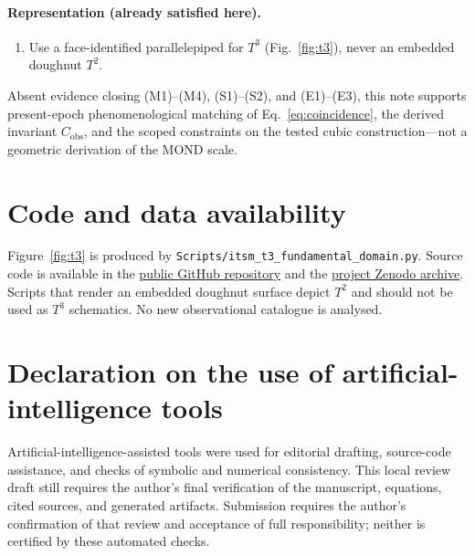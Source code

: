 \documentclass[aps,prd,reprint,superscriptaddress,nofootinbib,floatfix,showkeys]{revtex4-2}
\newcommand{\Tthree}{T^{3}}
\newcommand{\Ttwo}{T^{2}}
\newcommand{\Cobs}{C_{\mathrm{obs}}}
\begin{document}
\paragraph{Representation (already satisfied here).}
\begin{enumerate}
\item[(R1)] Use a face-identified parallelepiped for \(\Tthree\)
  (Fig.~\ref{fig:t3}), never an embedded doughnut \(\Ttwo\).
\end{enumerate}

Absent evidence closing (M1)--(M4), (S1)--(S2), and (E1)--(E3), this note
supports present-epoch phenomenological matching of
Eq.~\eqref{eq:coincidence}, the derived invariant \(\Cobs\), and the scoped
constraints on the tested cubic construction---not a geometric derivation of
the MOND scale.

\section*{Code and data availability}

\begingroup
\raggedright
Figure~\ref{fig:t3} is produced by
\texttt{Scripts/itsm\_t3\_fundamental\_domain.py}.
Source code is available in the
\href{https://github.com/brendohxd/ITSM-Integrated-Toroidal-Syntropic-Model}{public GitHub repository}
and the \href{https://doi.org/10.5281/zenodo.18808348}{project Zenodo archive}.
Scripts that render an embedded doughnut surface depict \(\Ttwo\) and should
not be used as \(\Tthree\) schematics.  No new observational catalogue is
analysed.
\par
\endgroup

\section*{Declaration on the use of artificial-intelligence tools}

Artificial-intelligence-assisted tools were used for editorial drafting,
source-code assistance, and checks of symbolic and numerical consistency.
This local review draft still requires the author's final verification of
the manuscript, equations, cited sources, and generated artifacts. Submission
requires the author's confirmation of that review and acceptance of full
responsibility; neither is certified by these automated checks.


\end{document}
